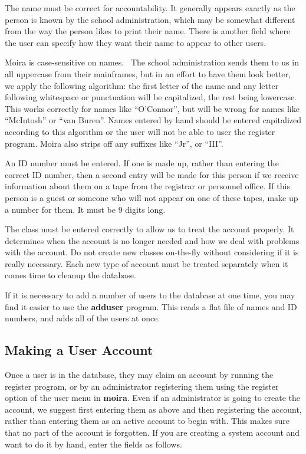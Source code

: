 \documentclass{book}
\begin{document}
The name must be correct for accountability.  It generally appears
exactly as the person is known by the school administration, which may
be somewhat different from the way the person likes to print their
name.  There is another field where the user can specify how they want
their name to appear to other users.

\label{namecaps}
Moira is case-sensitive on names.  \athena\ The school administration sends
them to us in all uppercase from their mainframes, but in an effort to
have them look better, we apply the following algorithm: the first
letter of the name and any letter following whitespace or punctuation
will be capitalized, the rest being lowercase.  This works correctly
for names like ``O'Connor'', but will be wrong for names like ``McIntosh''
or ``van Buren''.  Names entered by hand should be entered capitalized
according to this algorithm or the user will not be able to user the
register program.  Moira also strips off any suffixes like ``Jr'', or
``III''.

An ID number must be entered.  If one is made up, rather than entering
the correct ID number, then a second entry will be made for this
person if we receive information about them on a tape from the
registrar or personnel office.  If this person is a guest or someone
who will not appear on one of these tapes, make up a number for them.
It must be 9 digits long.

The class must be entered correctly to allow us to treat the account
properly.  It determines when the account is no longer needed and how
we deal with problems with the account.  Do not create new classes
on-the-fly without considering if it is really necessary.  Each new
type of account must be treated separately when it comes time to
cleanup the database.

If it is necessary to add a number of users to the database at one
time, you may find it easier to use the {\bf adduser} program.  This
reads a flat file of names and ID numbers, and adds all of the users
at once.

\subsection{Making a User Account}

Once a user is in the database, they may claim an account by running
the register program, or by an administrator registering them using
the register option of the user menu in {\bf moira}.  Even if an
administrator is going to create the account, we suggest first
entering them as above and then registering the account, rather than
entering them as an active account to begin with.  This makes sure
that no part of the account is forgotten.  If you are creating a
system account and want to do it by hand, enter the fields as follows.
\end{document}
